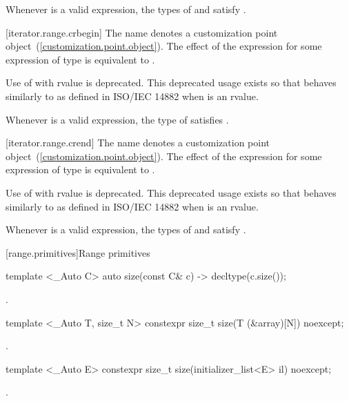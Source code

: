 {\pnum
\remark Whenever  is a valid expression, the
types of  and  satisfy
.

[iterator.range.crbegin]{}
\pnum
The name  denotes a customization point
object~(\ref{customization.point.object}). The effect of the expression
 for some expression  of type 
is equivalent to .

\pnum
Use of  with rvalue  is deprecated.
\enternote This deprecated usage exists so that 
behaves similarly to  as defined in ISO/IEC 14882 when
 is an rvalue. \exitnote

\pnum
\enternote Whenever  is a valid expression, the
type of  satisfies . \exitnote

[iterator.range.crend]{}
\pnum
The name  denotes a customization point
object~(\ref{customization.point.object}). The effect of the expression
 for some expression  of type 
is equivalent to .

\pnum
Use of  with rvalue  is deprecated.
\enternote This deprecated usage exists so that 
behaves similarly to  as defined in ISO/IEC 14882 when
 is an rvalue. \exitnote

\pnum
\enternote Whenever  is a valid expression, the
types of  and  satisfy
. \exitnote
} %

{\color{newclr}
[range.primitives]{Range primitives}
}

{\color{oldclr}
%
\begin{itemdecl}
template <_Auto C> auto size(const C& c) -> decltype(c.size());
\end{itemdecl}
\begin{itemdescr}
\pnum \returns {}.
\end{itemdescr}

\begin{itemdecl}
template <_Auto T, size_t N> constexpr size_t size(T (&array)[N]) noexcept;
\end{itemdecl}
\begin{itemdescr}
\pnum \returns {}.
\end{itemdescr}

\begin{itemdecl}
template <_Auto E> constexpr size_t size(initializer_list<E> il) noexcept;
\end{itemdecl}
\begin{itemdescr}
\pnum \returns {}.
\end{itemdescr}
} %

